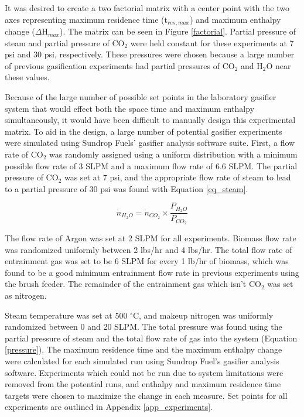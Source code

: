 \documentclass[11pt,twocolumn]{article}
\begin{document}
It was desired to create a two factorial matrix with a center point with the two axes representing maximum residence time (t$_{res,max}$) and maximum enthalpy change ($\Delta$H$_{max}$).  The matrix can be seen in Figure \ref{factorial}.  Partial pressure of steam and partial pressure of CO$_2$ were held constant for these experiments at 7 psi and 30 psi, respectively.  These pressures were chosen because a large number of previous gasification experiments had partial pressures of CO$_2$ and H$_2$O near these values.  

Because of the large number of possible set points in the laboratory gasifier system that would effect both the space time and maximum enthalpy simultaneously, it would have been difficult to manually design this experimental matrix.  To aid in the design, a large number of potential gasifier experiments were simulated using Sundrop Fuels' gasifier analysis software suite.  First, a flow rate of CO$_2$ was randomly assigned using a uniform distribution with a minimum possible flow rate of 3 SLPM and a maximum flow rate of 6.6 SLPM.  The partial pressure of CO$_2$ was set at 7 psi, and the appropriate flow rate of steam to lead to a partial pressure of 30 psi was found with Equation \ref{eq_steam}.

\begin{equation}
	\dot{n}_{H_2O} = \dot{n}_{CO_2} \times \frac{P_{H_2O}}{P_{CO_2}}
	\label{eq_steam}
\end{equation}

The flow rate of Argon was set at 2 SLPM for all experiments.  Biomass flow rate was randomized uniformly between 2 lbs/hr and 4 lbs/hr.  The total flow rate of entrainment gas was set to be 6 SLPM for every 1 lb/hr of biomass, which was found to be a good minimum entrainment flow rate in previous experiments using the brush feeder.  The remainder of the entrainment gas which isn't CO$_2$ was set as nitrogen.

Steam temperature was set at 500 $^\circ$C, and makeup nitrogen was uniformly randomized between 0 and 20 SLPM.  The total pressure was found using the partial pressure of steam and the total flow rate of gas into the system (Equation \ref{pressure}).  The maximum residence time and the maximum enthalpy change were calculated for each simulated run using Sundrop Fuel's gasifier analysis software.  Experiments which could not be run due to system limitations were removed from the potential runs, and enthalpy and maximum residence time targets were chosen to maximize the change in each measure.  Set points for all experiments are outlined in Appendix \ref{app_experiments}.
\end{document}
